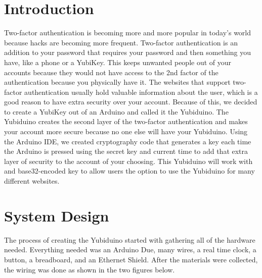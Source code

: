 \documentclass[conference]{IEEEtran}
\begin{document}




%
\IEEEpeerreviewmaketitle



\section{Introduction}
Two-factor authentication is becoming more and more popular in today’s world
because hacks are becoming more frequent.  Two-factor authentication is an
addition to your password that requires your password and then something you
have, like a phone or a YubiKey.  This keeps unwanted people out of your
accounts because they would not have access to the 2nd factor of the
authentication because you physically have it. The websites that support
two-factor authentication usually hold valuable information about the user,
which is a good reason to have extra security over your account.  Because of
this, we decided to create a YubiKey out of an Arduino and called it the
Yubiduino.  The Yubiduino creates the second layer of the two-factor
authentication and makes your account more secure because no one else will have
your Yubiduino.  Using the Arduino IDE, we created cryptography code that
generates a key each time the Arduino is pressed using the secret key and
current time to add that extra layer of security to the account of your
choosing.  This Yubiduino will work with and base32-encoded key to allow users
the option to use the Yubiduino for many different websites.


\section{System Design}
The process of creating the Yubiduino started with gathering all of the
hardware needed. Everything needed was an Arduino Due, many wires, a real time
clock, a button, a breadboard, and an Ethernet Shield.  After the materials
were collected, the wiring was done as shown in the two figures below.
\end{document}
